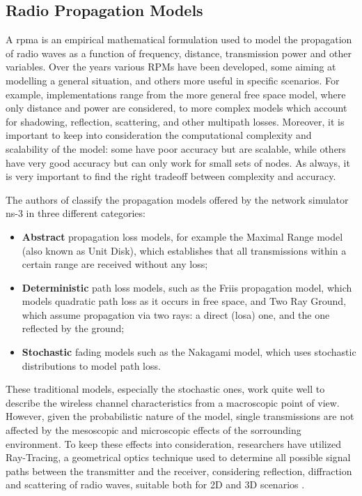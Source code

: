\begin{enumerate}
\begin{enumerate}
	\section{Radio Propagation Models}
		A \gls{rpma} is an empirical mathematical formulation used to model the propagation of radio waves as a function of frequency, distance, transmission power and other variables. Over the years various RPMs have been developed, some aiming at modelling a general situation, and others more useful in specific scenarios. For example, implementations range from the more general free space model, where only distance and power are considered, to more complex models which account for shadowing, reflection, scattering, and other multipath losses. Moreover, it is important to keep into consideration the computational complexity and scalability of the model: some have poor accuracy but are scalable, while others have very good accuracy but can only work for small sets of nodes. As always, it is very important to find the right tradeoff between complexity and accuracy.
		
		
		The authors of \cite{6298165} classify the propagation models offered by the network simulator ns-3 in three different categories:
		\begin{itemize}
			\item \textbf{Abstract} propagation loss models, for example the Maximal Range model (also known as Unit Disk), which establishes that all transmissions within a certain range are received without any loss;
			\item \textbf{Deterministic} path loss models, such as the Friis propagation model, which models quadratic path loss as it occurs in free space, and Two Ray Ground, which assume propagation via two rays: a direct (\acrshort{losa}) one, and the one reflected by the ground;
			\item \textbf{Stochastic} fading models such as the Nakagami model, which uses stochastic distributions to model path loss.
		\end{itemize}
	
	
		These traditional models, especially the stochastic ones, work quite well to describe the wireless channel characteristics from a macroscopic point of view. However, given the probabilistic nature of the model, single transmissions are not affected by the mesoscopic and microscopic effects of the sorrounding environment. To keep these effects into consideration, researchers have utilized Ray-Tracing, a geometrical optics technique used to determine all possible signal paths between the transmitter and the receiver, considering reflection, diffraction and scattering of radio waves, suitable both for 2D and 3D scenarios \cite{245274} \cite{765022}.
		

\end{enumerate}
\end{enumerate}
